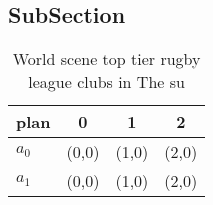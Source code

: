 \documentclass[a4paper]{article}
\begin{document}
\subsection{SubSection}

\begin{table}
\begin{adjustbox}{width=0.6\columnwidth}
\begin{tabular}{|l|l|l|l|}
\hline
\textbf{plan} & \multicolumn{1}{c|}{\textbf{0}} & \multicolumn{1}{c|}{\textbf{1}} & \multicolumn{1}{c|}{\textbf{2}} \\ \hline
\textbf{$a_0$}  & (0,0) & (1,0) & (2,0) \\ \hline
\textbf{$a_1$}  & (0,0) & (1,0) & (2,0) \\ \hline
\end{tabular}
\end{adjustbox}
\caption{World scene top tier rugby league clubs in The su
}
\end{table}
\end{document}
